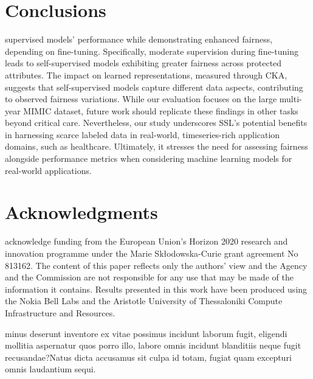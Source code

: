 \documentclass[letterpaper]{article} %
\begin{document}
\section{Conclusions}
 supervised models' performance while demonstrating enhanced fairness, depending on fine-tuning. Specifically, moderate supervision during fine-tuning leads to self-supervised models exhibiting greater fairness across protected attributes. The impact on learned representations, measured through CKA, suggests that self-supervised models capture different data aspects, contributing to observed fairness variations.
While our evaluation focuses on the large multi-year MIMIC dataset, future work should replicate these findings in other tasks beyond critical care. Nevertheless, our study underscores SSL's potential benefits in harnessing scarce labeled data in real-world, timeseries-rich application domains, such as healthcare. Ultimately, it stresses the need for assessing fairness alongside performance metrics when considering machine learning models for real-world applications.

\section{Acknowledgments}
 acknowledge funding from the European Union’s Horizon 2020 research and innovation programme under the Marie Skłodowska-Curie grant agreement No 813162. The content of this paper reflects only the authors' view and the Agency and the Commission are not responsible for any use that may be made of the information it contains.
Results presented in this work have been produced using the Nokia Bell Labs and the Aristotle University of Thessaloniki Compute Infrastructure and Resources.


 minus deserunt inventore ex vitae possimus incidunt laborum fugit, eligendi mollitia aspernatur quos porro illo, labore omnis incidunt blanditiis neque fugit recusandae?Natus dicta accusamus sit culpa id totam, fugiat quam excepturi omnis laudantium sequi.\clearpage

\end{document}

